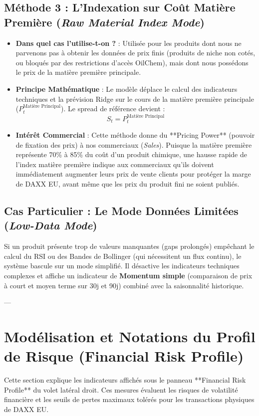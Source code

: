 \documentclass[12pt,a4paper]{article}
\begin{document}
\subsection{Méthode 3 : L'Indexation sur Coût Matière Première (\textit{Raw Material Index Mode})}
\begin{itemize}
    \item \textbf{Dans quel cas l'utilise-t-on ?} : Utilisée pour les produits dont nous ne parvenons pas à obtenir les données de prix finis (produits de niche non cotés, ou bloqués par des restrictions d'accès OilChem), mais dont nous possédons le prix de la matière première principale.
    \item \textbf{Principe Mathématique} : Le modèle déplace le calcul des indicateurs techniques et la prévision Ridge sur le cours de la matière première principale ($P^{\text{Matière Principal}}_t$). Le spread de référence devient :
    \begin{equation}
    S_t = P^{\text{Matière Principal}}_t
    \end{equation}
    \item \textbf{Intérêt Commercial} : Cette méthode donne du **Pricing Power** (pouvoir de fixation des prix) à nos commerciaux (\textit{Sales}). Puisque la matière première représente 70\% à 85\% du coût d'un produit chimique, une hausse rapide de l'index matière première indique aux commerciaux qu'ils doivent immédiatement augmenter leurs prix de vente clients pour protéger la marge de DAXX EU, avant même que les prix du produit fini ne soient publiés.
\end{itemize}

\subsection{Cas Particulier : Le Mode Données Limitées (\textit{Low-Data Mode})}
Si un produit présente trop de valeurs manquantes (gaps prolongés) empêchant le calcul du RSI ou des Bandes de Bollinger (qui nécessitent un flux continu), le système bascule sur un mode simplifié. Il désactive les indicateurs techniques complexes et affiche un indicateur de \textbf{Momentum simple} (comparaison de prix à court et moyen terme sur 30j et 90j) combiné avec la saisonnalité historique.

---

\section{Modélisation et Notations du Profil de Risque (Financial Risk Profile)}
Cette section explique les indicateurs affichés sous le panneau **Financial Risk Profile** du volet latéral droit. Ces mesures évaluent les risques de volatilité financière et les seuils de pertes maximaux tolérés pour les transactions physiques de DAXX EU.
\end{document}
